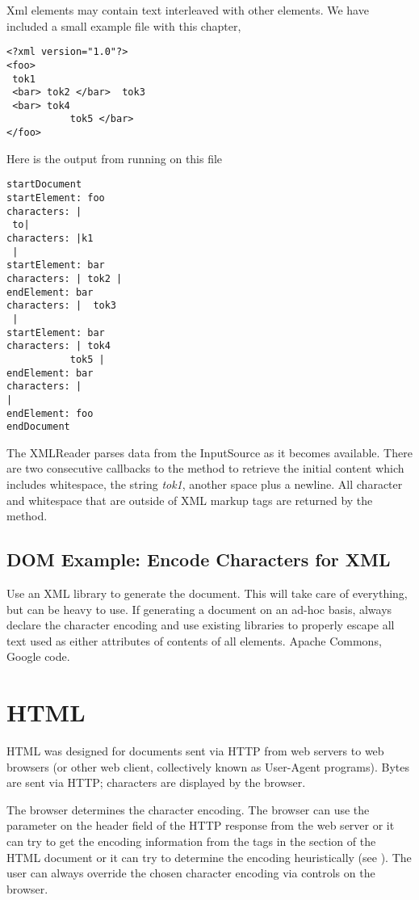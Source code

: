 Xml elements may contain text interleaved with other elements.
We have included a small example file with this chapter,
%
\begin{verbatim}
<?xml version="1.0"?>
<foo> 
 tok1 
 <bar> tok2 </bar>  tok3 
 <bar> tok4 
           tok5 </bar>
</foo>
\end{verbatim} 
Here is the output from running  on this file
\begin{verbatim} 
startDocument
startElement: foo
characters: | 
 to|
characters: |k1 
 |
startElement: bar
characters: | tok2 |
endElement: bar
characters: |  tok3 
 |
startElement: bar
characters: | tok4 
           tok5 |
endElement: bar
characters: |
|
endElement: foo
endDocument
\end{verbatim}
The XMLReader parses data from the InputSource as it becomes available.
There are two consecutive callbacks to the  method to
retrieve the initial content which includes whitespace, the string \emph{tok1},
another space plus a newline.
All character and whitespace that are outside of XML markup tags are returned
by the  method.

\subsection{DOM Example: Encode Characters for XML}

Use an XML library to generate the document.
This will take care of everything, but can be heavy to use.
If generating a document on an ad-hoc basis, always declare
the character encoding and use existing libraries to properly
escape all text used as either attributes of contents of all elements.
Apache Commons, Google code.


\section{HTML}

HTML was designed for documents sent via HTTP from web servers
to web browsers (or other web client, collectively known as User-Agent programs).
Bytes are sent via HTTP; characters are displayed by the browser.

The browser determines the character encoding.
The browser can use the  parameter on the
 header field of the HTTP response
from the web server or it can try to get the encoding information
from the  tags in the  section of the HTML document
or it can try to determine the encoding heuristically
(see ).
The user can always override the chosen character encoding 
via controls on the browser.

